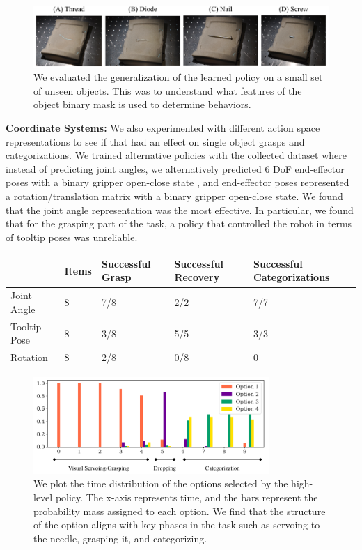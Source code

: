 \begin{figure} [t]
    \includegraphics[width=\textwidth]{ddco-experiments/unseen.png}
    \caption{We evaluated the generalization of the learned policy on a small set of unseen objects. This was to understand what features of the object binary mask is used to determine behaviors.\label{fig:dvrkgen}}
\end{figure}

\vspace{0.25em} \noindent \textbf{Coordinate Systems: } We also experimented with different action space representations to see if that had an effect on single object grasps and categorizations. We trained alternative policies with the collected dataset where instead of predicting joint angles, we alternatively predicted 6 DoF end-effector poses with a binary gripper open-close state , and end-effector poses represented a rotation/translation matrix with a binary gripper open-close state. 
We found that the joint angle representation was the most effective. 
In particular, we found that for the grasping part of the task, a policy that controlled the robot in terms of tooltip poses was unreliable.

\begin{table}[ht!]\footnotesize
\centering
\label{my-label}
\begin{tabular}{l|l|l|l|l|}
       & Items & Successful Grasp & Successful Recovery & Successful Categorizations \\
       \hline
Joint Angle & 8     & 7/8         & 2/2    & 7/7                         \\
Tooltip Pose  & 8     & 3/8         & 5/5    & 3/3                             \\
Rotation   & 8     & 2/8          & 0/8    & 0                     
\end{tabular}
\end{table}
\begin{figure} [t]
\centering
    \includegraphics[width=0.8\textwidth]{ddco-experiments/highlevel-options.png}
    \caption{We plot the time distribution of the options selected by the high-level policy. The x-axis represents time, and the bars represent the probability mass assigned to each option. We find that the structure of the option aligns with key phases in the task such as servoing to the needle, grasping it, and categorizing. \label{fig:dvrkhl}}
\end{figure}

